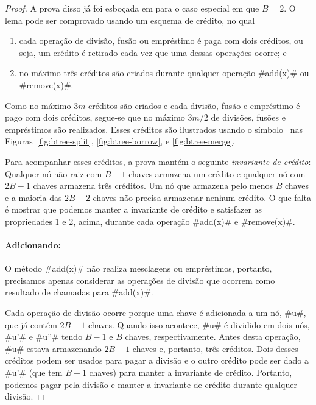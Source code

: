 \begin{proof}
   A prova disso já foi esboçada em
    para o caso especial em que $B=2$.
   O lema pode ser comprovado usando um esquema de crédito,
   no qual
  \begin{enumerate}
    \item cada operação de divisão, fusão ou empréstimo é paga com dois créditos, ou seja, um crédito é retirado cada vez que uma dessas operações ocorre; e
    \item no máximo três créditos são criados durante qualquer operação #add(x)# ou #remove(x)#.
  \end{enumerate}
  Como no máximo $3m$ créditos são criados e cada divisão, fusão e empréstimo é pago com dois créditos, segue-se que no máximo $3m/2$ de divisões, fusões e empréstimos são realizados.
  Esses créditos são ilustrados usando o símbolo \cent\ nas Figuras~\ref{fig:btree-split}, \ref{fig:btree-borrow}, e
  \ref{fig:btree-merge}.

  Para acompanhar esses créditos, a prova mantém o seguinte 
  \emph {invariante de crédito}:
  Qualquer nó não raiz com $B-1$ chaves  armazena um crédito e qualquer nó com $2B-1$ chaves  armazena três créditos. Um nó que armazena pelo menos $B$ chaves e a maioria das $2B-2$ chaves  não precisa armazenar nenhum crédito. O que falta é mostrar que podemos manter a invariante de crédito e satisfazer as propriedades 1 e 2, acima, durante cada operação #add(x)# e #remove(x)#.

  \paragraph{Adicionando:}
  O método #add(x)# não realiza mesclagens ou empréstimos, portanto, precisamos apenas considerar as operações de divisão que ocorrem como resultado de chamadas para #add(x)#.

  Cada operação de divisão ocorre porque uma chave é adicionada a um nó, #u#, que já contém $2B-1$ chaves. Quando isso acontece, #u# é dividido em dois nós, #u'# e #u''# tendo $B-1$ e $B$ chaves, respectivamente. Antes desta operação, #u# estava armazenando $2B-1$ chaves  e, portanto, três créditos.
  Dois desses créditos podem ser usados para pagar a divisão e o outro crédito pode ser dado a #u'# (que tem $B-1$ chaves) para manter a invariante de crédito. Portanto, podemos pagar pela divisão e manter a invariante de crédito durante qualquer divisão.


\end{proof}
